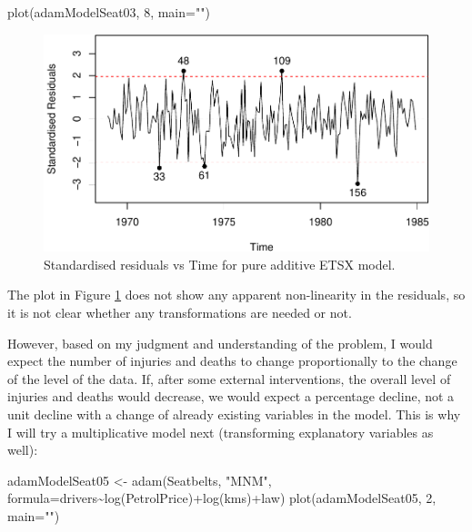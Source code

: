 \documentclass[
]{book}
\newenvironment{Shaded}{\begin{snugshade}}{\end{snugshade}}
\newcommand{\AttributeTok}[1]{\textcolor[rgb]{0.77,0.63,0.00}{#1}}
\newcommand{\DecValTok}[1]{\textcolor[rgb]{0.00,0.00,0.81}{#1}}
\newcommand{\FunctionTok}[1]{\textcolor[rgb]{0.00,0.00,0.00}{#1}}
\newcommand{\NormalTok}[1]{#1}
\newcommand{\OtherTok}[1]{\textcolor[rgb]{0.56,0.35,0.01}{#1}}
\newcommand{\SpecialCharTok}[1]{\textcolor[rgb]{0.00,0.00,0.00}{#1}}
\newcommand{\StringTok}[1]{\textcolor[rgb]{0.31,0.60,0.02}{#1}}
\theoremstyle{definition}
\theoremstyle{definition}
\theoremstyle{definition}
\theoremstyle{definition}
\theoremstyle{remark}
\begin{document}
\begin{Shaded}
\begin{Highlighting}[]
\FunctionTok{plot}\NormalTok{(adamModelSeat03, }\DecValTok{8}\NormalTok{, }\AttributeTok{main=}\StringTok{""}\NormalTok{)}
\end{Highlighting}
\end{Shaded}

\begin{figure}
\centering
\includegraphics{Svetunkov--2022----ADAM_files/figure-latex/adamModelSeat03ResidTime-1.pdf}
\caption{\label{fig:adamModelSeat03ResidTime}Standardised residuals vs Time for pure additive ETSX model.}
\end{figure}

The plot in Figure \ref{fig:adamModelSeat03ResidTime} does not show any apparent non-linearity in the residuals, so it is not clear whether any transformations are needed or not.

However, based on my judgment and understanding of the problem, I would expect the number of injuries and deaths to change proportionally to the change of the level of the data. If, after some external interventions, the overall level of injuries and deaths would decrease, we would expect a percentage decline, not a unit decline with a change of already existing variables in the model. This is why I will try a multiplicative model next (transforming explanatory variables as well):

\begin{Shaded}
\begin{Highlighting}[]
\NormalTok{adamModelSeat05 }\OtherTok{\textless{}{-}} \FunctionTok{adam}\NormalTok{(Seatbelts, }\StringTok{"MNM"}\NormalTok{,}
                        \AttributeTok{formula=}\NormalTok{drivers}\SpecialCharTok{\textasciitilde{}}\FunctionTok{log}\NormalTok{(PetrolPrice)}\SpecialCharTok{+}\FunctionTok{log}\NormalTok{(kms)}\SpecialCharTok{+}\NormalTok{law)}
\FunctionTok{plot}\NormalTok{(adamModelSeat05, }\DecValTok{2}\NormalTok{, }\AttributeTok{main=}\StringTok{""}\NormalTok{)}
\end{Highlighting}
\end{Shaded}
\end{document}
